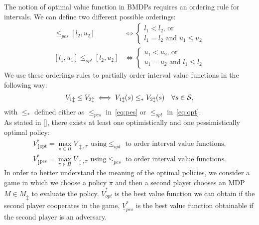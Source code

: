 \newline
The notion of optimal value function in \ac{BMDP}s requires an ordering rule for intervals. We can define two different possible orderings:
\begin{align}
[l_1, u_1] \leq_{pes} [l_2, u_2] &\Leftrightarrow 
\begin{cases}
l_1 < l_2 \text{, or }\\
l_1 = l_2 \text{ and } u_1 \leq u_2
\end{cases} \label{eq:pes}\\
[l_1, u_1] \leq_{opt} [l_2, u_2] &\Leftrightarrow 
\begin{cases}
u_1 < u_2 \text{, or }\\
u_1 = u_2 \text{ and } l_1 \leq l_2
\end{cases} \label{eq:opt}
\end{align}
We use these orderings rules to partially order interval value functions in the following way:
\begin{align} V_{1 \updownarrow} \leq V_{2 \updownarrow} \iff V_{1 \updownarrow}(s) \leq_{*} V_{2 \updownarrow}(s) \quad \forall s \in \mathcal{S}, \end{align}
with $\leq_{*}$ defined either as $\leq_{pes}$ in~\eqref{eq:pes} or $\leq_{opt}$ in~\eqref{eq:opt}.\\
\newline
As stated in [\cite{givan2000bounded}], there exists at least one optimistically and one pessimistically optimal policy:
\begin{align*}
V^{*}_{\updownarrow \text{opt}} = \max_{\pi \in \Pi} V_{\updownarrow, \pi} \text{ using} \leq_{opt} \text{ to order interval value functions,}\\
V^{*}_{\updownarrow \text{pes}} = \max_{\pi \in \Pi} V_{\updownarrow, \pi} \text{ using} \leq_{pes} \text{ to order interval value functions.}
\end{align*}
In order to better understand the meaning of the optimal policies, we consider a game in which we choose a policy $\pi$ and then a second player chooses an \ac{MDP} $M \in M_{\updownarrow}$ to evaluate the policy. $\overline{V}^{*}_{opt}$ is the best value function we can obtain if the second player cooperates in the game, $\underline{V}^{*}_{pes}$ is the best value function obtainable if the second player is an adversary.
